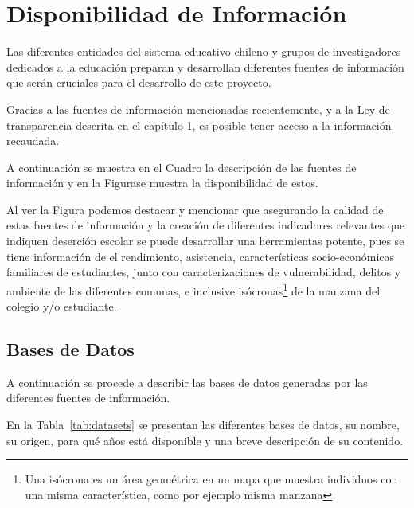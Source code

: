 \section{Disponibilidad de Información}
Las diferentes entidades del sistema educativo chileno y grupos de investigadores dedicados a la educación preparan y desarrollan diferentes fuentes de información que serán cruciales para el desarrollo de este proyecto.

Gracias a las fuentes de información mencionadas recientemente, y a la Ley de transparencia descrita en el capítulo 1, es posible tener acceso a la información recaudada.

A continuación se muestra en el Cuadro la descripción de las fuentes de información y en la Figurase muestra la disponibilidad de estos.

Al ver la Figura podemos destacar y mencionar que asegurando la calidad de estas fuentes de información y la creación de diferentes indicadores relevantes que indiquen deserción escolar se puede desarrollar una herramientas potente, pues se tiene información de el rendimiento, asistencia, características socio-económicas familiares de estudiantes, junto con caracterizaciones de vulnerabilidad, delitos y ambiente de las diferentes comunas, e inclusive isócronas\footnote{Una isócrona es un área geométrica en un mapa que muestra individuos con una misma característica, como por ejemplo misma manzana} de la manzana del colegio y/o estudiante.


\subsection{Bases de Datos}
A continuación se procede a describir las bases de datos generadas por las diferentes fuentes de información. 

En la Tabla~\ref{tab:datasets} se presentan las diferentes bases de datos, su nombre, su origen, para qué años está disponible y una breve descripción de su contenido.

